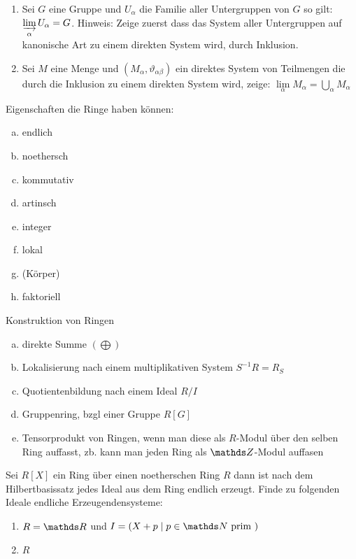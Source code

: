 \documentclass[ngerman, parskip=half, titlepage=false]{scrartcl}
\begin{document}
\begin{Lem} 
  \begin{enumerate}[1)]
  \item Sei $G$ eine Gruppe und $U_\alpha$ die Familie aller
    Untergruppen von $G$ so gilt: $\varinjlim\limits_{\alpha} U_\alpha = G$.
    Hinweis: Zeige zuerst dass das System aller Untergruppen auf kanonische Art
    zu einem direkten System wird, durch Inklusion.
  \item Sei $M$ eine Menge und $(M_\alpha, \vartheta_{\alpha\beta})$
    ein direktes System von Teilmengen die durch die Inklusion zu
    einem direkten System wird, zeige:
    $\lim\limits_{\alpha} M_\alpha = \bigcup\limits_\alpha M_\alpha$
  \end{enumerate}
\end{Lem}

Eigenschaften die Ringe haben können:
\begin{enumerate}[a)]
  \item endlich
  \item noethersch
  \item kommutativ
  \item artinsch
  \item integer
  \item lokal
  \item (Körper)
  \item faktoriell
\end{enumerate}

Konstruktion von Ringen
\begin{enumerate}[a)]
  \item direkte Summe $(\bigoplus)$
  \item Lokalisierung nach einem multiplikativen System  $S^{-1}R = R_S$
  \item Quotientenbildung nach einem Ideal $R/I$
  \item Gruppenring, bzgl einer Gruppe $R[G]$
  \item Tensorprodukt von Ringen, wenn man diese als $R$-Modul über
    den selben Ring auffasst, zb. kann man jeden Ring als $\Z$-Modul auffasen
\end{enumerate}

\begin{Beh}
  Sei $R[X]$ ein Ring über einen noetherschen Ring $R$ dann ist nach
  dem Hilbertbasissatz jedes Ideal aus dem Ring endlich erzeugt. Finde
  zu folgenden Ideale endliche Erzeugendensysteme:\\
  \begin{enumerate}[1)]
  \item $R=\R$ und $I = \left( X + p \; | \;  p \in \N \text{ prim }  \right)$
  \item $R$
  \end{enumerate}
\end{Beh}
\end{document}
